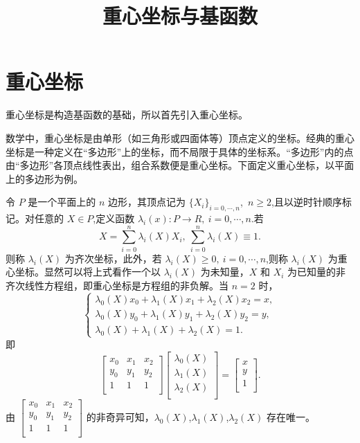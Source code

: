 \documentclass[12pt,a4paper]{article}
\title{重心坐标与基函数}
\author{}
\date{\chntoday}
\begin{document}
\maketitle

\section{重心坐标}
重心坐标是构造基函数的基础，所以首先引入重心坐标。

数学中，重心坐标是由单形（如三角形或四面体等）顶点定义的坐标。经典的重心坐标是一种定义在“多边形”上的坐标，而不局限于具体的坐标系。“多边形”内的点由“多边形”各顶点线性表出，组合系数便是重心坐标。下面定义重心坐标，以平面上的多边形为例。

令 $P$ 是一个平面上的 $n$ 边形，其顶点记为 $\lbrace X_i\rbrace_{i=0,\cdots,n}$,~$n\ge 2$,且以逆时针顺序标记。对任意的 $X\in P$,定义函数 $\lambda _i(x):P\longrightarrow R,~i=0,\cdots,n$.若
$$
X=\sum_{i=0}^n \lambda _i(X)X_i,~\sum_{i=0}^n\lambda _i(X)\equiv 1.
$$
则称 $\lambda _i(X)$ 为齐次坐标，此外，若 $\lambda _i(X)\ge 0,~i=0,\cdots,n$,则称 $\lambda _i(X)$ 为重心坐标。显然可以将上式看作一个以 $\lambda _i(X)$ 为未知量，$X$ 和 $X_i$ 为已知量的非齐次线性方程组，即重心坐标是方程组的非负解。当 $n=2$ 时，
$$
\begin{cases}
\lambda _0(X)x_0+\lambda _1(X)x_1+\lambda _2(X)x_2=x,\\
\lambda _0(X)y_0+\lambda _1(X)y_1+\lambda _2(X)y_2=y,\\
\lambda _0(X)+\lambda _1(X)+\lambda _2(X)=1.
\end{cases}
$$
即
$$
\begin{bmatrix}
x_0 & x_1 & x_2\\
y_0 & y_1 & y_2\\
1 & 1 & 1\\
\end{bmatrix}
\begin{bmatrix}
\lambda _0(X)\\
\lambda _1(X)\\
\lambda _2(X)\\
\end{bmatrix}=\begin{bmatrix}
x\\
y\\
1\\
\end{bmatrix}.
$$
由 $\begin{bmatrix}
x_0 & x_1 & x_2\\
y_0 & y_1 & y_2\\
1 & 1 & 1\\
\end{bmatrix}$ 的非奇异可知，$\lambda _0(X)$,$\lambda _1(X)$,$\lambda _2(X)$ 存在唯一。
\end{document}
